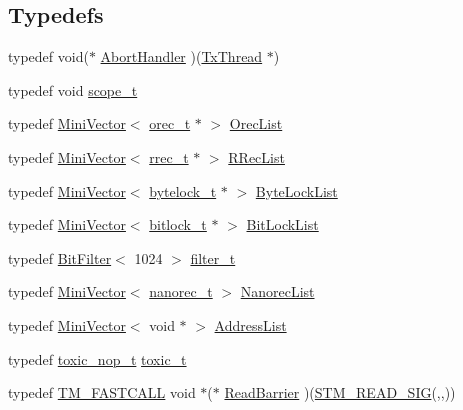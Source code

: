 \subsection*{Typedefs}
\begin{DoxyCompactItemize}
\item 
typedef void($\ast$ \hyperlink{namespacestm_a8c4b0bd094cade5163014a1f0a17d4cd}{Abort\-Handler} )(\hyperlink{structstm_1_1TxThread}{Tx\-Thread} $\ast$)
\item 
typedef void \hyperlink{namespacestm_a91badf88c88aacc831b01a315435a255}{scope\-\_\-t}
\item 
typedef \hyperlink{classstm_1_1MiniVector}{Mini\-Vector}$<$ \hyperlink{structstm_1_1orec__t}{orec\-\_\-t} $\ast$ $>$ \hyperlink{namespacestm_aa243a42287cc0cf0fdf20fb4cddd4d02}{Orec\-List}
\item 
typedef \hyperlink{classstm_1_1MiniVector}{Mini\-Vector}$<$ \hyperlink{structstm_1_1rrec__t}{rrec\-\_\-t} $\ast$ $>$ \hyperlink{namespacestm_afad5b3d1a775f6e65cd1e675ba984839}{R\-Rec\-List}
\item 
typedef \hyperlink{classstm_1_1MiniVector}{Mini\-Vector}$<$ \hyperlink{structstm_1_1bytelock__t}{bytelock\-\_\-t} $\ast$ $>$ \hyperlink{namespacestm_adde267538d3124b2b405e5bc9d1135f4}{Byte\-Lock\-List}
\item 
typedef \hyperlink{classstm_1_1MiniVector}{Mini\-Vector}$<$ \hyperlink{structstm_1_1bitlock__t}{bitlock\-\_\-t} $\ast$ $>$ \hyperlink{namespacestm_ab4b8c3282dc3d14aded2b969e07b5213}{Bit\-Lock\-List}
\item 
typedef \hyperlink{classstm_1_1BitFilter}{Bit\-Filter}$<$ 1024 $>$ \hyperlink{namespacestm_a34196fa5dc72823aaaa307a6e353704e}{filter\-\_\-t}
\item 
typedef \hyperlink{classstm_1_1MiniVector}{Mini\-Vector}$<$ \hyperlink{structstm_1_1nanorec__t}{nanorec\-\_\-t} $>$ \hyperlink{namespacestm_a5a70108dbd954a2634cf59d668ea8241}{Nanorec\-List}
\item 
typedef \hyperlink{classstm_1_1MiniVector}{Mini\-Vector}$<$ void $\ast$ $>$ \hyperlink{namespacestm_a1f450babd9df052917264e0e0705e90b}{Address\-List}
\item 
typedef \hyperlink{structstm_1_1toxic__nop__t}{toxic\-\_\-nop\-\_\-t} \hyperlink{namespacestm_a1a3981a9b82aa51afd56d191ca1e3984}{toxic\-\_\-t}
\item 
typedef \hyperlink{platform_8hpp_a8b5d728e6eed8f368f9966f637d2f719}{T\-M\-\_\-\-F\-A\-S\-T\-C\-A\-L\-L} void $\ast$($\ast$ \hyperlink{namespacestm_a656ebc647a656fffc1ff640cb818c669}{Read\-Barrier} )(\hyperlink{include_2stm_2macros_8hpp_abae784c2079f9c1ecc6a72cfeb795db4}{S\-T\-M\-\_\-\-R\-E\-A\-D\-\_\-\-S\-I\-G}(,,))

\end{DoxyCompactItemize}
